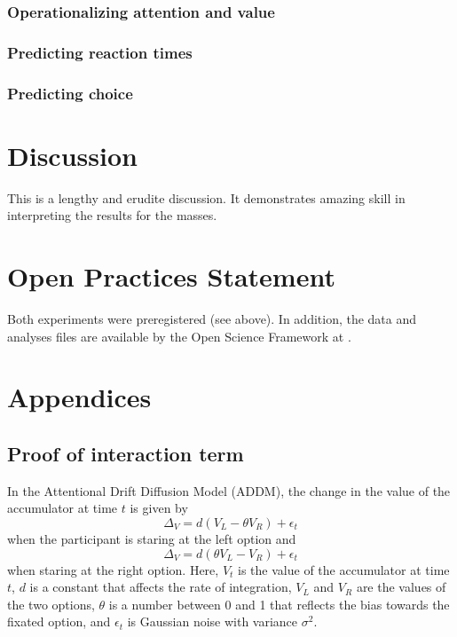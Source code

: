 \documentclass[doc, a4paper, apacite]{apa6}
\begin{document}
\subsubsection{Operationalizing attention and value}

\subsubsection{Predicting reaction times}

\subsubsection{Predicting choice}



\section{Discussion}
This is a lengthy and erudite discussion.  It demonstrates amazing
skill in interpreting the results for the masses.

\section{Open Practices Statement}
Both experiments were preregistered (see above). In addition, the data and analyses files are available by the Open Science Framework at \url{}. 

\clearpage
\newpage



\clearpage
\newpage
\section{Appendices}

\subsection{Proof of interaction term}
In the Attentional Drift Diffusion Model (ADDM), the change in the value of the accumulator at time $t$ is given by 
\begin{equation}
	\Delta_V = d(V_L - \theta V_R) + \epsilon_t
\end{equation}
when the participant is staring at the left option and
\begin{equation}
	\Delta_V = d(\theta V_L - V_R) + \epsilon_t
\end{equation}
when staring at the right option. Here, $V_t$ is the value of the accumulator at time $t$, $d$ is a constant that affects the rate of integration, $V_L$ and $V_R$ are the values of the two options, $\theta$ is a number between 0 and 1 that reflects the bias towards the fixated option, and $\epsilon_t$ is Gaussian noise with variance $\sigma^2$. 
\end{document}
